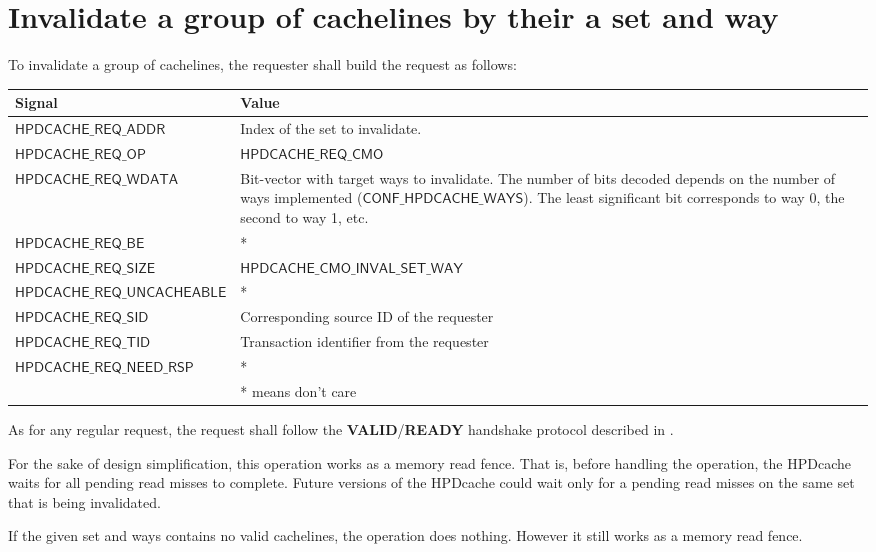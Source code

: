 \documentclass[10pt,titlepage,twoside]{book}
\begin{document}
\newpage
\section{Invalidate a group of cachelines by their a set and way}

To invalidate a group of cachelines, the requester shall build the request as follows:

{\centering\footnotesize\begin{tabular}{p{.38\linewidth}p{.55\linewidth}}
  \toprule
  \textbf{Signal}
  & \textbf{Value} \\
  \midrule
  $\mathsf{HPDCACHE\_REQ\_ADDR}$
  & Index of the set to invalidate.\\
  \midrule
  $\mathsf{HPDCACHE\_REQ\_OP}$
  & $\mathsf{HPDCACHE\_REQ\_CMO}$ \\
  \midrule
  $\mathsf{HPDCACHE\_REQ\_WDATA}$
  & Bit-vector with target ways to invalidate.
  The number of bits decoded depends on the number of ways implemented ($\mathsf{CONF\_HPDCACHE\_WAYS}$).
  The least significant bit corresponds to way 0, the second to way 1, etc.\\
  \midrule
  $\mathsf{HPDCACHE\_REQ\_BE}$
  & *\\
  \midrule
  $\mathsf{HPDCACHE\_REQ\_SIZE}$
  & $\mathsf{HPDCACHE\_CMO\_INVAL\_SET\_WAY}$\\
  \midrule
  $\mathsf{HPDCACHE\_REQ\_UNCACHEABLE}$
  & *\\
  \midrule
  $\mathsf{HPDCACHE\_REQ\_SID}$
  & Corresponding source ID of the requester\\
  \midrule
  $\mathsf{HPDCACHE\_REQ\_TID}$
  & Transaction identifier from the requester\\
  \midrule
  $\mathsf{HPDCACHE\_REQ\_NEED\_RSP}$
  & *\\
  \bottomrule
  & * means don't care \\
\end{tabular}}

As for any regular request, the request shall follow the \textbf{VALID}/\textbf{READY} handshake protocol described in .

For the sake of design simplification, this operation works as a memory read fence.
That is, before handling the operation, the \ac{HPDcache} waits for all pending read misses to complete.
Future versions of the HPDcache could wait only for a pending read misses on the same set that is being invalidated.

If the given set and ways contains no valid cachelines, the operation does nothing.
However it still works as a memory read fence.
\end{document}
